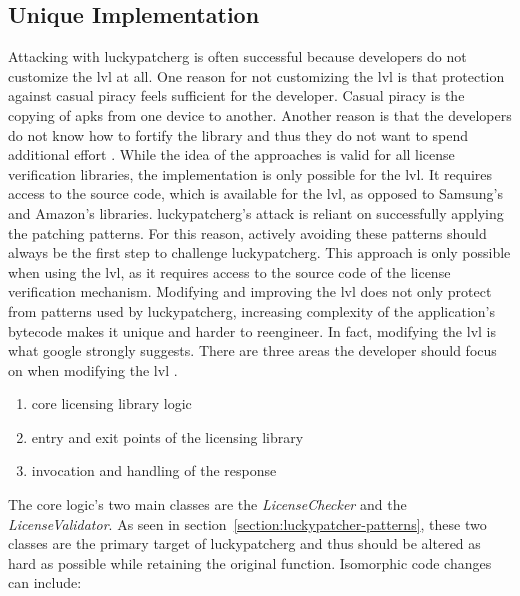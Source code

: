 \subsection{Unique Implementation} \label{subsection:counter-modifications-library}
Attacking with \gls{luckypatcherg} is often successful because developers do not customize the \gls{lvl} at all.
One reason for not customizing the \gls{lvl} is that protection against casual piracy feels sufficient for the developer.
Casual piracy is the copying of \gls{apk}s from one device to another.
\newline
Another reason is that the developers do not know how to fortify the library and thus they do not want to spend additional effort \cite{developersSecuring}.
\newline
While the idea of the approaches is valid for all license verification libraries, the implementation is only possible for the \gls{lvl}.
It requires access to the source code, which is available for the \gls{lvl}, as opposed to Samsung's and Amazon's libraries.
\newline
\gls{luckypatcherg}'s attack is reliant on successfully applying the patching patterns.
For this reason, actively avoiding these patterns should always be the first step to challenge \gls{luckypatcherg}.
This approach is only possible when using the \gls{lvl}, as it requires access to the source code of the license verification mechanism.
Modifying and improving the \gls{lvl} does not only protect from patterns used by \gls{luckypatcherg}, increasing complexity of the application's bytecode makes it unique and harder to reengineer.
In fact, modifying the lvl is what google strongly suggests.\cite{developersSecuring}
\newline
There are three areas the developer should focus on when modifying the \gls{lvl}  \cite{developersSecuring}.
\begin{enumerate}
\item core licensing library logic
\item entry and exit points of the licensing library
\item invocation and handling of the response
\end{enumerate}
The core logic’s two main classes are the \textit{LicenseChecker} and the \textit{LicenseValidator}.
As seen in section~\ref{section:luckypatcher-patterns}, these two classes are the primary target of \gls{luckypatcherg} and thus should be altered as hard as possible while retaining the original function.
Isomorphic code changes can include:

